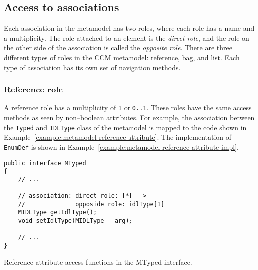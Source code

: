 \subsection{Access to associations}

Each association in the metamodel has two roles, where each role has a name and
a multiplicity. The role attached to an element is the {\em direct role}, and
the role on the other side of the association is called the {\em opposite role}.
There are three different types of roles in the CCM metamodel: reference, bag,
and list. Each type of association has its own set of navigation methods.

\subsubsection{Reference role}

A reference role has a multiplicity of {\tt 1} or {\tt 0..1}. These roles have
the same access methods as seen by non--boolean attributes. For example, the
association between the {\tt Typed} and {\tt IDLType} class of the metamodel is
mapped to the code shown in Example~\ref{example:metamodel-reference-attribute}. The
implementation of {\tt EnumDef} is shown in
Example~\ref{example:metamodel-reference-attribute-impl}.

\begin{Example}
\begin{minifbox}
\begin{verbatim}
public interface MTyped
{
    // ...

    // association: direct role: [*] -->
    //              opposide role: idlType[1]
    MIDLType getIdlType();
    void setIdlType(MIDLType __arg);

    // ...
}
\end{verbatim}
\end{minifbox}
\caption{Reference attribute access functions in the MTyped interface.}
\label{example:metamodel-reference-attribute}
\end{Example}

